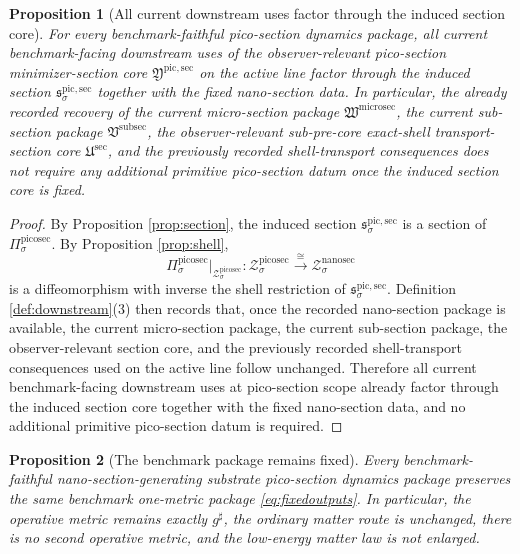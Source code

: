 \documentclass[11pt]{article}
\newcommand{\CompletedMetric}{g^{\sharp}}
\newcommand{\SubSectionPackage}{\mathfrak V^{\mathrm{subsec}}}
\newcommand{\MicroSectionPackage}{\mathfrak W^{\mathrm{microsec}}}
\newcommand{\SubPreSectionCore}{\mathfrak U^{\mathrm{sec}}}
\newcommand{\NanoSectionShell}[1]{\mathcal Z_{#1}^{\mathrm{nanosec}}}
\newcommand{\PicoSectionProj}[1]{\Pi_{#1}^{\mathrm{picosec}}}
\newcommand{\PicoSectionShell}[1]{\mathcal Z_{#1}^{\mathrm{picosec}}}
\newcommand{\PicoMinSectionCore}{\mathfrak Y^{\mathrm{pic,sec}}}
\newcommand{\PicoMinSection}[1]{\mathfrak s_{#1}^{\mathrm{pic,sec}}}
\newtheorem{proposition}{Proposition}
\begin{document}
\begin{proposition}[All current downstream uses factor through the induced section core]
\label{prop:downstream}
For every benchmark-faithful pico-section dynamics package, all current benchmark-facing downstream uses of the observer-relevant pico-section minimizer-section core \(\PicoMinSectionCore\) on the active line factor through the induced section \(\PicoMinSection{\sigma}\) together with the fixed nano-section data. In particular, the already recorded recovery of the current micro-section package \(\MicroSectionPackage\), the current sub-section package \(\SubSectionPackage\), the observer-relevant sub-pre-core exact-shell transport-section core \(\SubPreSectionCore\), and the previously recorded shell-transport consequences does not require any additional primitive pico-section datum once the induced section core is fixed.
\end{proposition}

\begin{proof}
By Proposition \ref{prop:section}, the induced section \(\PicoMinSection{\sigma}\) is a section of \(\PicoSectionProj{\sigma}\). By Proposition \ref{prop:shell},
\[
\PicoSectionProj{\sigma}\big|_{\PicoSectionShell{\sigma}}
:
\PicoSectionShell{\sigma}\xrightarrow{\cong}\NanoSectionShell{\sigma}
\]
is a diffeomorphism with inverse the shell restriction of \(\PicoMinSection{\sigma}\). Definition \ref{def:downstream}(3) then records that, once the recorded nano-section package is available, the current micro-section package, the current sub-section package, the observer-relevant section core, and the previously recorded shell-transport consequences used on the active line follow unchanged. Therefore all current benchmark-facing downstream uses at pico-section scope already factor through the induced section core together with the fixed nano-section data, and no additional primitive pico-section datum is required.
\end{proof}

\begin{proposition}[The benchmark package remains fixed]
\label{prop:benchmark}
Every benchmark-faithful nano-section-generating substrate pico-section dynamics package preserves the same benchmark one-metric package \eqref{eq:fixedoutputs}. In particular, the operative metric remains exactly \(\CompletedMetric\), the ordinary matter route is unchanged, there is no second operative metric, and the low-energy matter law is not enlarged.
\end{proposition}
\end{document}
